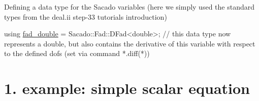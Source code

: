  Defining a data type for the Sacado variables (here we simply used the standard types from the deal.\+ii step-\/33 tutorial\textquotesingle{}s introduction) 
\begin{DoxyCode}
\textcolor{keyword}{using} \hyperlink{Sacado-auxiliary__functions_8h_a868b94676739e612d9c95940e70892a9}{fad\_double} = Sacado::Fad::DFad<double>;   \textcolor{comment}{// this data type now represents a double, but
       also contains the derivative of this variable with respect to the defined dofs (set via command *.diff(*))}
\end{DoxyCode}
 \hypertarget{index_Ex1}{}\section{1. example\+: simple scalar equation}\label{index_Ex1}

